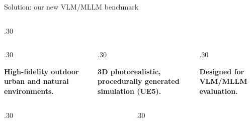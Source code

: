 \documentclass[final]{beamer}
\newlength{\colwidth}
\begin{document}
\begin{frame}[t]
\begin{columns}[t]
\begin{column}{\colwidth}
\begin{block}{Solution: our new VLM/MLLM benchmark}
\begin{columns}[t,totalwidth=\colwidth]
\begin{column}{.30\colwidth}
\begin{center}
 
\end{center}
\end{column}
\end{columns}
\vspace{.5cm}
\begin{columns}[t,totalwidth=\colwidth]

\begin{column}{.30\colwidth}
\begin{center}
\textbf{High-fidelity outdoor urban and natural environments.}
\end{center}
\end{column}

\begin{column}{.30\colwidth}
\begin{center}
\textbf{3D photorealistic, procedurally generated simulation (UE5).}
\end{center}
\end{column}

\begin{column}{.30\colwidth}
\begin{center}
\textbf{Designed for VLM/MLLM evaluation.}
\end{center}
\end{column}
\end{columns}

\vspace{2cm}

\begin{columns}[t,totalwidth=\colwidth]

    \begin{column}{.30\colwidth}
    \begin{center}
     
    \end{center}
    \end{column}
    
    \begin{column}{.30\colwidth}
    \begin{center}
     
    \end{center}
    \end{column}
    

\end{columns}
\end{block}
\end{column}
\end{columns}
\end{frame}
\end{document}
